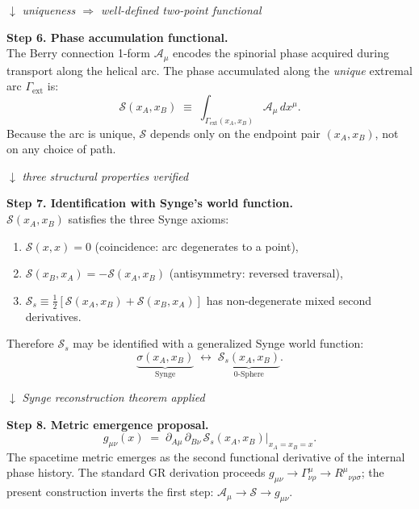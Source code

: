 \documentclass[12pt,letterpaper]{article}
\newcommand{\calS}{\mathcal{S}}
\newcommand{\calA}{\mathcal{A}}
\begin{document}
\begin{mdframed}[style=chainbox]
\vspace{0.4cm}
$\downarrow$ \textit{uniqueness $\Rightarrow$ well-defined two-point functional}

\vspace{0.4cm}
\textbf{Step 6. Phase accumulation functional.}\\
The Berry connection 1-form $\calA_\mu$ encodes the spinorial phase acquired during
transport along the helical arc. The phase accumulated along the \emph{unique} extremal
arc $\Gamma_{\mathrm{ext}}$ is:
\begin{equation}
\calS(x_A, x_B) \;\equiv\; \int_{\Gamma_{\mathrm{ext}}(x_A,x_B)} \calA_\mu\,dx^\mu.
\label{eq:S_def}
\end{equation}
Because the arc is unique, $\calS$ depends only on the endpoint pair $(x_A, x_B)$,
not on any choice of path.

\vspace{0.4cm}
$\downarrow$ \textit{three structural properties verified}

\vspace{0.4cm}
\textbf{Step 7. Identification with Synge's world function.}\\
$\calS(x_A, x_B)$ satisfies the three Synge axioms:
\begin{enumerate}[label=(\roman*), leftmargin=3em, itemsep=2pt]
  \item $\calS(x,x) = 0$ (coincidence: arc degenerates to a point),
  \item $\calS(x_B,x_A) = -\calS(x_A,x_B)$ (antisymmetry: reversed traversal),
  \item $\calS_s \equiv \frac{1}{2}[\calS(x_A,x_B)+\calS(x_B,x_A)]$
        has non-degenerate mixed second derivatives.
\end{enumerate}
Therefore $\calS_s$ may be identified with a generalized Synge world function:
\begin{equation}
\underbrace{\sigma(x_A,x_B)}_{\text{Synge}}
\;\longleftrightarrow\;
\underbrace{\calS_s(x_A,x_B)}_{\text{0-Sphere}}.
\label{eq:synge_identification}
\end{equation}

\vspace{0.4cm}
$\downarrow$ \textit{Synge reconstruction theorem applied}

\vspace{0.4cm}
\textbf{Step 8. Metric emergence proposal.}
\begin{equation}
\boxed{g_{\mu\nu}(x) \;=\; \partial_{A\mu}\,\partial_{B\nu}\,\calS_s(x_A, x_B) \Big|_{x_A = x_B = x}.}
\label{eq:metric_proposal}
\end{equation}
The spacetime metric emerges as the second functional derivative of the internal
phase history. The standard GR derivation proceeds
$g_{\mu\nu}\to\Gamma^\mu_{\nu\rho}\to R^\mu{}_{\nu\rho\sigma}$;
the present construction inverts the first step:
$\calA_\mu\to\calS\to g_{\mu\nu}$.
\end{mdframed}
\end{document}
